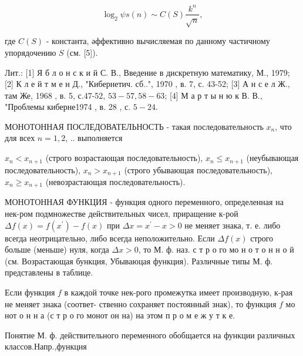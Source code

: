 \documentclass[10pt]{article}
\begin{document}
\[

\log _{2} \psi s(n) \sim C(S) \frac{k^{n}}{\sqrt{n}},

\]



где $C(S)$ - константа, әффективно вычисляемая по данному частичному упорядочению $S$ (см. [5]).



Лит.: [1] Я б л о н с к и й С. В., Введение в дискретную математику, М., 1979; [2] К л е й т м е н Д., "Кибернетич. сб..", 1970 , в. 7, с. 43-52; [3] А н с е л Ж., там Же, 1968 , в. 5, с.47-52, $53-57,58-63$; [4] М а р т ы н ю к В. В., "Проблемы киберне1974 , в. 28 , с. $5-24$.



МОНОТОННАЯ ПОСЛЕДОВАТЕЛЬНОСТЬ - такая последовательность $x_{n}$, что для всех $n=1,2$, .. выполняется



$x_{n}<x_{n+1}$ (строго возрастающая последовательность), $x_{n} \leqslant x_{n+1}$ (неубывающая последовательность), $x_{n}>x_{n+1}$ (строго убывающая последовательность), $x_{n} \geqslant x_{n+1}$ (невозрастающая последовательность).



МОНОТОННАЯ ФУНКЦИЯ - функция одного переменного, определенная на нек-ром подмножестве действительных чисел, приращение к-рой $\Delta f(x)=f\left(x^{\prime}\right)-f(x)$ при $\Delta x=x^{\prime}-x>0$ не меняет знака, т. е. либо всегда неотрицательно, либо всегда неположительно. Если $\Delta f(x)$ строго больше (меньше) нуля, когда $\Delta x>0$, то М. ф. наз. с т р о го мо н о т о н н о й (см. Возрастающая бункция, Убываюцая функция). Различные типы М. ф. представлены в таблице.



Если функция $f$ в каждой точке нек-рого промежутка имеет производную, к-рая не меняет знака (соответ- ственно сохраняет постоянный знак), то функция $f$ мо нот о н н а (с т р о го монот он на) на этом п р о м е ж у т к е.



Понятие М. ф. действительного переменного обобщается на функции различных классов.Напр.,функция
\end{document}
